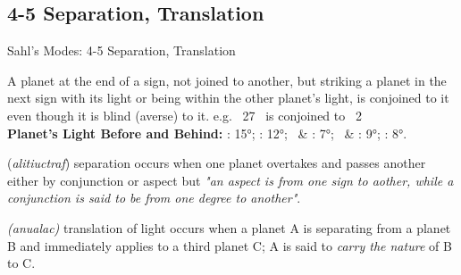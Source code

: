 \subsection{4-5 Separation, Translation}
\begin{frame}[t]{Sahl's Modes: 4-5 Separation, Translation}
\begin{description}[style=nextline]
\item[3. Connection Cont'd] A planet at the end of a sign, not joined to another, but striking a planet in the next sign with its light or being within the other planet's light, is conjoined to it even though it is blind (averse) to it\footnotemark[1]. e.g. \Moon\ 27 \Aries\ is conjoined to \Venus\ 2 \Taurus \\
\vspace{1em}
\textbf{Planet's Light Before and Behind:} \Sun: 15°; \Moon: 12°; \Venus\ \& \Mercury: 7°; \Jupiter\ \& \Saturn: 9°; \Mars: 8°. \\

\item[4. Separation] (\textsl{alitiuctraf}) separation occurs when one planet overtakes and passes another either by conjunction or aspect but \textsl{"an aspect is from one sign to aother, while a conjunction is said to be from one degree to another"}. \\

\item[5. Translation] \textsl{(anualac)} translation of light occurs when a planet A is separating from a planet B and immediately applies to a third planet C; A is said to \textsl{carry the nature} of B to C. 
\end{description}

\end{frame}

